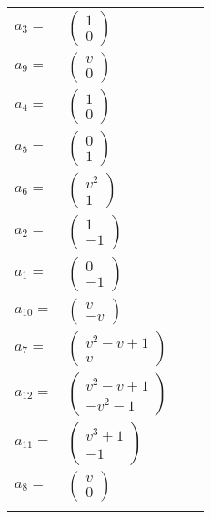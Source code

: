 \documentclass[1p]{elsarticle_modified}
\theoremstyle{definition}
\begin{document}
\begin{tabular}{m{7pt} m{180pt} m{7pt} m{180pt} }
\flushright $a_{3}=$&$\begin{pmatrix}1\\0\end{pmatrix}$ \\
\flushright $a_{9}=$&$\begin{pmatrix}v\\0\end{pmatrix}$ \\
\flushright $a_{4}=$&$\begin{pmatrix}1\\0\end{pmatrix}$ \\
\flushright $a_{5}=$&$\begin{pmatrix}0\\1\end{pmatrix}$ \\
\flushright $a_{6}=$&$\begin{pmatrix}v^2\\1\end{pmatrix}$ \\
\flushright $a_{2}=$&$\begin{pmatrix}1\\-1\end{pmatrix}$ \\
\flushright $a_{1}=$&$\begin{pmatrix}0\\-1\end{pmatrix}$ \\
\flushright $a_{10}=$&$\begin{pmatrix}v\\- v\end{pmatrix}$ \\
\flushright $a_{7}=$&$\begin{pmatrix}v^2- v+1\\v\end{pmatrix}$ \\
\flushright $a_{12}=$&$\begin{pmatrix}v^2- v+1\\- v^2-1\end{pmatrix}$ \\
\flushright $a_{11}=$&$\begin{pmatrix}v^3+1\\-1\end{pmatrix}$ \\
\flushright $a_{8}=$&$\begin{pmatrix}v\\0\end{pmatrix}$\\&\end{tabular}
\end{document}
